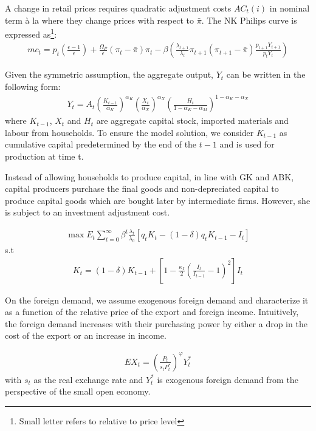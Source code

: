 \documentclass[12pt, a4paper]{article}
\begin{document}
A change in retail prices requires quadratic adjustment costs $AC_t(i)$ in nominal term à la \cite{rotemberg1982sticky} where they change prices with respect to  $\bar{\pi}$. The NK Philips curve is expressed as\footnote{Small letter refers to relative to price level}:
\begin{align} 
 mc_{t} =p_{t}(\frac{\epsilon-1}{\epsilon})+   \frac{\Omega_P}{\epsilon}(\pi_{t}-\bar\pi)\pi_{t}-\beta\left(\frac{\lambda_{t+1}}{\lambda_t}\pi_{t+1}(\pi_{t+1}-\bar\pi)\frac{p_{t+1}Y_{t+1}}{p_{t}Y_{t} }\right) 
\end{align}

Given the symmetric assumption, the aggregate output, $Y_t$ can be written in the following form:
\begin{align}
    Y_t= A_t \left(\frac{K_{t-1}}{\alpha_K}\right)^{\alpha_K} \left(\frac{X_{t}}{\alpha_X}\right)^{\alpha_X}
    \left(\frac{H_{t}}{1-\alpha_K-\alpha_M}\right)^{1-\alpha_K-\alpha_X}
\end{align}
where $K_{t-1}$, $X_t$ and $H_t$ are aggregate capital stock, imported materials and labour from households. To ensure the model solution, we consider $K_{t-1}$ as cumulative capital predetermined by the end of the $t-1$ and is used for production at time t.

Instead of allowing households to produce capital, in line with GK and ABK, capital producers purchase the final goods and non-depreciated capital to produce capital goods which are bought later by intermediate firms. However, she is subject to an investment adjustment cost.

\begin{align}
\max E_t \sum_{t=0}^\infty\beta^t\frac{\lambda_{t}}{\lambda_0}[q_t K_t-(1-\delta)q_t K_{t-1}-I_t]
\end{align}s.t
\begin{align}
K_t = (1-\delta) K_{t-1} +\left[1-\frac{\kappa_I}{2}\left(\frac{I_t}{I_{t-1}}-1\right)^2\right]I_t
\end{align}

On the foreign demand, we assume exogenous foreign demand and characterize it as a function of the relative price of the export and foreign income. Intuitively, the foreign demand increases with their purchasing power by either a drop in the cost of the export or an increase in income.

\begin{align}
    EX_t=\left(\frac{P_t}{s_tP^*_t}\right)^{\varphi} Y^*_t
\end{align}
with $s_t$ as the real exchange rate and $Y^*_t$ is exogenous foreign demand  from the perspective of the small open economy.
\end{document}

